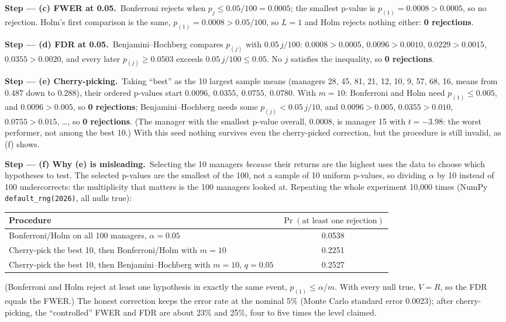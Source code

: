 \documentclass[11pt,a4paper]{article}
\numberwithin{equation}{questao}   %
\newcommand{\passo}[2]{\par\smallskip\noindent\textbf{Step --- #1.}~#2}
\begin{document}
\begin{sol}
\passo{(c) FWER at 0.05}{Bonferroni rejects when $p_j\le0.05/100=0.0005$; the smallest p-value is
$p_{(1)}=0.0008>0.0005$, so no rejection. Holm's first comparison is the same,
$p_{(1)}=0.0008>0.05/100$, so $L=1$ and Holm rejects nothing either: \textbf{0 rejections}.}

\passo{(d) FDR at 0.05}{Benjamini--Hochberg compares $p_{(j)}$ with $0.05\,j/100$:
$0.0008>0.0005$, $0.0096>0.0010$, $0.0229>0.0015$, $0.0355>0.0020$, and every later $p_{(j)}\ge0.0503$
exceeds $0.05\,j/100\le0.05$. No $j$ satisfies the inequality, so \textbf{0 rejections}.}

\passo{(e) Cherry-picking}{Taking ``best'' as the 10 largest sample means (managers 28, 45, 81, 21, 12,
10, 9, 57, 68, 16, means from $0.487$ down to $0.288$), their ordered p-values start
$0.0096,\ 0.0355,\ 0.0755,\ 0.0780$. With $m=10$: Bonferroni and Holm need $p_{(1)}\le0.005$, and
$0.0096>0.005$, so \textbf{0 rejections}; Benjamini--Hochberg needs some $p_{(j)}<0.05\,j/10$, and
$0.0096>0.005$, $0.0355>0.010$, $0.0755>0.015$, \dots, so \textbf{0 rejections}. (The manager with the
smallest p-value overall, $0.0008$, is manager 15 with $t=-3.98$: the worst performer, not among the
best 10.) With this seed nothing survives even the cherry-picked correction, but the procedure is
still invalid, as (f) shows.}

\passo{(f) Why (e) is misleading}{Selecting the 10 managers \emph{because} their returns are the
highest uses the data to choose which hypotheses to test. The selected p-values are the smallest of
the 100, not a sample of 10 uniform p-values, so dividing $\alpha$ by 10 instead of 100 undercorrects:
the multiplicity that matters is the 100 managers looked at. Repeating the whole experiment 10{,}000
times (NumPy \texttt{default\_rng(2026)}, all nulls true):}
\begin{center}\small
\begin{tabular}{lc}
\toprule
Procedure & $\Pr(\text{at least one rejection})$\\
\midrule
Bonferroni/Holm on all 100 managers, $\alpha=0.05$ & 0.0538\\
Cherry-pick the best 10, then Bonferroni/Holm with $m=10$ & 0.2251\\
Cherry-pick the best 10, then Benjamini--Hochberg with $m=10$, $q=0.05$ & 0.2527\\
\bottomrule
\end{tabular}
\end{center}
(Bonferroni and Holm reject at least one hypothesis in exactly the same event, $p_{(1)}\le\alpha/m$.
With every null true, $V=R$, so the FDR equals the FWER.) The honest correction keeps the error rate
at the nominal 5\% (Monte Carlo standard error $0.0023$); after cherry-picking, the ``controlled''
FWER and FDR are about 23\% and 25\%, four to five times the level claimed.


\end{sol}
\end{document}

